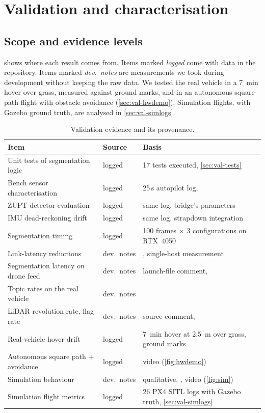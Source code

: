 \section{Validation and characterisation}
\label{sec:validation}

\subsection{Scope and evidence levels}

 shows where each result comes from. Items marked \emph{logged}
come with data in the repository. Items marked \emph{dev.\ notes} are measurements we took during
development without keeping the raw data. We tested the real vehicle in a \SI{7}{\minute} hover over grass, measured against ground marks, and
in an autonomous square-path flight with obstacle avoidance (\cref{sec:val-hwdemo}).
Simulation flights, with Gazebo ground truth, are analysed in \cref{sec:val-simlogs}.

\begin{table}[H]
\centering\small
\caption{Validation evidence and its provenance.}
\label{tab:evidence}
\begin{tabularx}{\textwidth}{p{4.6cm} p{2.0cm} L}
\toprule
\textbf{Item} & \textbf{Source} & \textbf{Basis} \\
\midrule
Unit tests of segmentation logic & logged & 17 tests executed, \cref{sec:val-tests} \\
Bench sensor characterisation & logged & 25\,s autopilot log,  \\
ZUPT detector evaluation & logged & same log, bridge's parameters \\
IMU dead-reckoning drift & logged & same log, strapdown integration \\
Segmentation timing & logged & 100 frames $\times$ 3 configurations on RTX~4050 \\
Link-latency reductions & dev.\ notes & , single-host measurement \\
Segmentation latency on drone feed & dev.\ notes & launch-file comment,  \\
Topic rates on the real vehicle & dev.\ notes &  \\
LiDAR revolution rate, flag rate & dev.\ notes & source comment,  \\
Real-vehicle hover drift & logged & \SI{7}{\minute}  hover at \SI{2.5}{\metre} over grass, ground marks \\
Autonomous square path + avoidance & logged & video (\cref{fig:hwdemo}) \\
Simulation behaviour & dev.\ notes & qualitative, , video (\cref{fig:sim}) \\
Simulation flight metrics & logged & 26 PX4 SITL logs with Gazebo truth, \cref{sec:val-simlogs} \\
\bottomrule
\end{tabularx}
\end{table}

